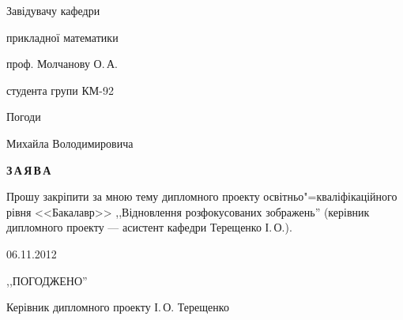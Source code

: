 \documentclass[a4paper,12pt,notitlepage,headsepline,pdftex]{scrartcl}
\begin{document}
\begin{titlepage}
  \hfill
  \begin{minipage}{0.4\textwidth}
    Завідувачу кафедри

    прикладної математики

    проф. Молчанову О.\,А.

    \vspace{0.3cm}

    студента групи КМ-92

    Погоди

    Михайла Володимировича
  \end{minipage}

  \vspace{3cm}
  \begin{center}
    \bf
    З\,А\,Я\,В\,А
  \end{center}

  \vspace{1cm}

  Прошу закріпити за мною тему дипломного проекту освітньо"=кваліфікаційного
  рівня <<Бакалавр>> ,,Відновлення розфокусованих зображень'' (керівник
  дипломного проекту --- асистент кафедри Терещенко І.\,О.).

  \vspace{1cm}

  \hspace{1cm}06.11.2012

  \hfill\underline{\hspace{2cm}}\hspace{1cm}

  \vspace{5cm}

  ,,ПОГОДЖЕНО''

  \vspace{0.5cm}

  Керівник дипломного проекту\hfill\underline{\hspace{2cm}}\hspace{1cm} І.\,О.
  Терещенко

\end{titlepage}
\end{document}
